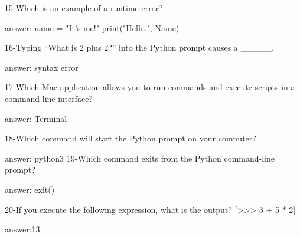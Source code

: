 15-Which is an example of a runtime error?

answer: name = "It's me!"
        print("Hello.", Name)

16-Typing “What is 2 plus 2?” into the Python prompt causes a _____.

answer: syntax error

17-Which Mac application allows you to run commands and execute scripts in a command-line interface?

answer: Terminal

18-Which command will start the Python prompt on your computer?

answer: python3
19-Which command exits from the Python command-line prompt?

answer: exit()

20-If you execute the following expression, what is the output? [>>> 3 + 5 * 2]

answer:13


